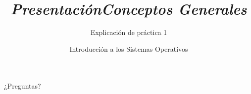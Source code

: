 


\author{Introducción a los Sistemas Operativos}



\title{\textit{Presentación}}
\subtitle{ }
\begin{frame}
  \titlepage
\end{frame}


\title{\textit{Conceptos Generales}}
\subtitle{Explicación de práctica 1}
\begin{frame}
  \titlepage
\end{frame}


\begin{frame}{}
  \begin{center}
    \vfill
    \huge ¿Preguntas?
    \vfill
  \end{center}
\end{frame}

